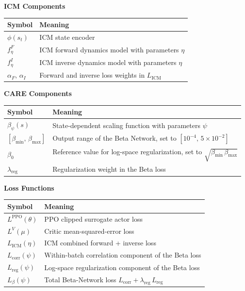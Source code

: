 \vspace{0.8em}

\textbf{ICM Components}

\begin{tabular}{|m{2.8cm}|m{11.3cm}|}
\hline
\textbf{Symbol} & \textbf{Meaning} \\
\hline
$\phi(s_t)$ & ICM state encoder \\
\hline
$f^F_\eta$ & ICM forward dynamics model with parameters $\eta$ \\
\hline
$f^I_\eta$ & ICM inverse dynamics model with parameters $\eta$ \\
\hline
$\alpha_F,\,\alpha_I$ & Forward and inverse loss weights in $L_\text{ICM}$ \\
\hline
\end{tabular}

\vspace{0.8em}

\textbf{CARE Components}

\begin{tabular}{|m{2.8cm}|m{11.3cm}|}
\hline
\textbf{Symbol} & \textbf{Meaning} \\
\hline
$\beta_\psi(s)$ & State-dependent scaling function with parameters $\psi$ \\
\hline
$[\beta_\text{min},\,\beta_\text{max}]$ & Output range of the Beta Network, set to $[10^{-4},\, 5\times 10^{-2}]$ \\
\hline
$\beta_0$ & Reference value for log-space regularization, set to $\sqrt{\beta_\text{min}\,\beta_\text{max}}$ \\
\hline
$\lambda_\text{reg}$ & Regularization weight in the Beta loss \\
\hline
\end{tabular}

\vspace{0.8em}

\textbf{Loss Functions}

\begin{tabular}{|m{2.8cm}|m{11.3cm}|}
\hline
\textbf{Symbol} & \textbf{Meaning} \\
\hline
$L^\text{PPO}(\theta)$ & PPO clipped surrogate actor loss \\
\hline
$L^V(\mu)$ & Critic mean-squared-error loss \\
\hline
$L_\text{ICM}(\eta)$ & ICM combined forward + inverse loss \\
\hline
$L_\text{corr}(\psi)$ & Within-batch correlation component of the Beta loss \\
\hline
$L_\text{reg}(\psi)$ & Log-space regularization component of the Beta loss \\
\hline
$L_\beta(\psi)$ & Total Beta-Network loss $L_\text{corr} + \lambda_\text{reg}\, L_\text{reg}$ \\
\hline
\end{tabular}

